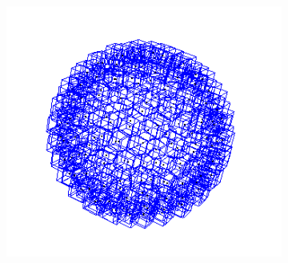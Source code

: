 \documentclass{beamer}
\begin{document}
\begin{frame}
\begin{figure}
\begin{subfigure}{.3\textwidth}
        \end{subfigure}
        \begin{subfigure}{.3\textwidth}
            \centering
            \includegraphics[scale=0.3]{img/sphere-cube-inter}
        \end{subfigure}
    \end{figure}
\end{frame}
\end{document}
